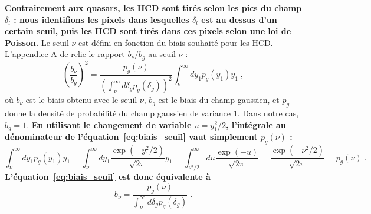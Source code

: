 \documentclass[11pt, twoside, a4paper, openright]{report}
\begin{document}
\textbf{Contrairement aux quasars, les HCD sont tirés selon les pics du champ $\delta_l$ : nous identifions les pixels dans lesquelles $\delta_l$ est au dessus d'un certain seuil, puis les HCD sont tirés dans ces pixels selon une loi de Poisson.}
Le seuil $\nu$ est défini en fonction du biais souhaité pour les HCD.
L'appendice A de \textcite{font-ribera_effect_2012} relie le rapport $b_{\nu} / b_g$ au seuil $\nu$ :
\begin{equation}
  \label{eq:biais_seuil}
  \left(\frac{b_{\nu}}{b_g}\right)^2 = \frac{p_g(\nu)}{\left( \int_{\nu}^{\infty} d\delta_g p_g(\delta_g) \right)^2} \int_{\nu}^{\infty} dy_1 p_g(y_1) y_1 \; ,
\end{equation}
où $b_{\nu}$ est le biais obtenu avec le seuil $\nu$, $b_g$ est le biais du champ gaussien, et $p_g$ donne la densité de probabilité du champ gaussien de variance 1. Dans notre cas, $b_g = 1$.
\textbf{En utilisant le changement de variable $u = y_1^2 / 2$, l'intégrale au dénominateur de l'équation~\ref{eq:biais_seuil} vaut simplement $p_g(\nu)$ :
\begin{equation}
  \label{eq:biais_seuil2}
  \int_{\nu}^\infty dy_1 p_g(y_1)y_1 = 
\int_{\nu}^\infty dy_1 \frac{\exp(-y_1^2/2)}{\sqrt{2\pi}}  y_1 = \int_{\nu^2/2}^\infty du \frac{\exp(-u)}{\sqrt{2\pi}}=\frac{\exp(-\nu^2/2)}{\sqrt{2\pi}}=p_g(\nu) \; .
\end{equation}
L'équation~\ref{eq:biais_seuil} est donc équivalente à
\begin{equation}
 b_{\nu} = \frac{p_g(\nu)}{\int_{\nu}^{\infty} d\delta_g p_g(\delta_g)} \; .
\end{equation}
}
\end{document}

